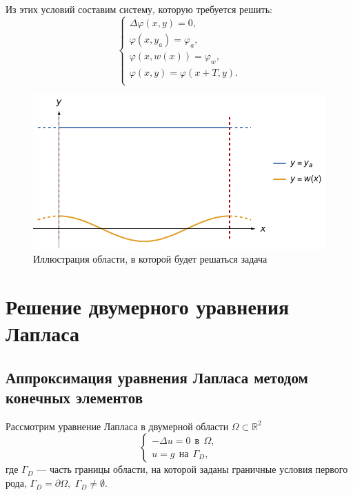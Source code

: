 \documentclass[12pt, a4paper]{article}
\renewcommand{\phi}{\varphi}
\begin{document}
			Из этих условий составим систему, которую требуется решить: 		
			\begin{equation}
				\begin{cases}
					\Delta \phi (x, y)  = 0, \\
					\phi (x, y_a) = \phi_a, \\
					\phi (x, w(x)) = \phi_w, \\
					\phi (x, y) = \phi (x + T, y).\\
					
				\end{cases}
			\end{equation}
			\begin{figure}[!h]
				\centering
				\includegraphics[width=1\textwidth]{illustr.pdf}
				\caption{Иллюстрация области, в которой будет решаться задача}
				\label{fig:illustr_1}
			\end{figure}
	
	\newpage
	\section{Решение двумерного уравнения Лапласа}
		
		
		\subsection{Аппроксимация уравнения Лапласа методом конечных элементов}
		
			Рассмотрим уравнение Лапласа в двумерной области $\Omega \subset \mathbb{R}^2$
			\begin{equation*}
				\begin{cases}
					- \Delta u  = 0 \ \  \text{в}\ \  \Omega, \\
					u = g \ \ \text{на}\ \  \Gamma_D,
				\end{cases}			
			\end{equation*}
			где $\Gamma_D$ --- часть границы области, на которой заданы граничные условия первого рода, $\Gamma_D = \partial \Omega,$  $\Gamma_D \ne \emptyset$. 
			
\end{document}

